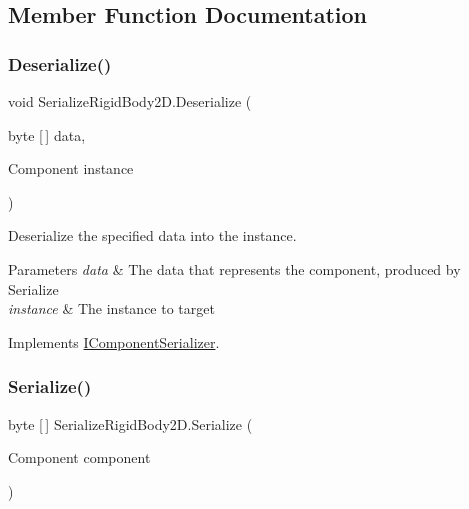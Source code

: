 \subsection{Member Function Documentation}
\mbox{\label{class_serialize_rigid_body2_d_ae143c153be5caaaa898e0d7e2951fbd2}} 
\subsubsection{\texorpdfstring{Deserialize()}{Deserialize()}}
{\footnotesize\ttfamily void Serialize\+Rigid\+Body2\+D.\+Deserialize (\begin{DoxyParamCaption}\item[{byte \mbox{[}$\,$\mbox{]}}]{data,  }\item[{Component}]{instance }\end{DoxyParamCaption})\hspace{0.3cm}{\ttfamily [inline]}}



Deserialize the specified data into the instance. 


\begin{DoxyParams}{Parameters}
{\em data} & The data that represents the component, produced by Serialize \\
\hline
{\em instance} & The instance to target \\
\hline
\end{DoxyParams}


Implements \hyperlink{interface_i_component_serializer_a4cc366a5c78b33d47a90c209d8fed883}{I\+Component\+Serializer}.

\mbox{\label{class_serialize_rigid_body2_d_a40d4ecd6dc6a136cb123fbb76d6ead00}} 
\subsubsection{\texorpdfstring{Serialize()}{Serialize()}}
{\footnotesize\ttfamily byte \mbox{[}$\,$\mbox{]} Serialize\+Rigid\+Body2\+D.\+Serialize (\begin{DoxyParamCaption}\item[{Component}]{component }\end{DoxyParamCaption})\hspace{0.3cm}{\ttfamily [inline]}}



